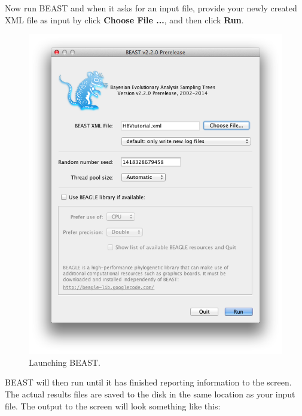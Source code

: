 \documentclass{article}
\begin{document}
Now run BEAST and when it asks for an input file, provide your newly
created XML file as input by click \textbf{Choose File ...}, and then click \textbf{Run}. 

\begin{figure}
\begin{center}

\includegraphics[scale=0.5]{figures/BEAST}

\end{center}
\caption{\label{fig.BEAST} Launching BEAST.}
\end{figure}


BEAST will then run until it has finished
reporting information to the screen. The actual results files are
saved to the disk in the same location as your input file. The output to the screen will
look something like this: 
\end{document}
